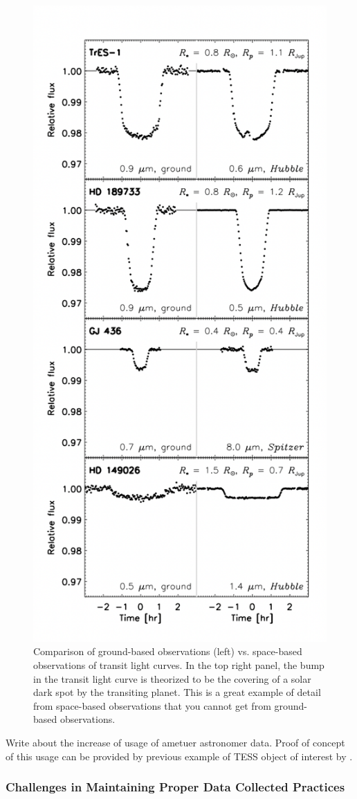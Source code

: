 \documentclass[oneside,12pt]{amsart}
\numberwithin{page}{section}
\begin{document}
\begin{figure}[htbp]
    \centering
    \includegraphics[width=0.5\linewidth]{figs/winn_fig8.png}
    \caption{Comparison of ground-based observations (left) vs. space-based observations of transit light curves. In the top right panel, the bump in the transit light curve is theorized to be the covering of a solar dark spot by the transiting planet. This is a great example of detail from space-based observations that you cannot get from ground-based observations.}
    \label{fig:winn-fig8}
\end{figure}

Write about the increase of usage of ametuer astronomer data. Proof of concept of this usage can be provided by previous example of TESS object of interest by \citep{sgro2024confirmation}.

\subsubsection{Challenges in Maintaining Proper Data Collected Practices}

\end{document}
